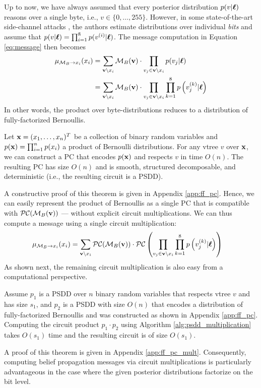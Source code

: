 Up to now, we have always assumed that every posterior distribution $p(v | \boldsymbol{\ell})$ reasons over a single byte, i.e., $v \in \{0,\dots,255\}$. However, in some state-of-the-art side-channel attacks \cite{bit_posterior1, bit_posterior2, breaking_free}, the authors estimate distributions over individual \textit{bits} and assume that $p(v | \boldsymbol{\ell}) = \prod_{i=1}^8 p(v^{(i)} | \boldsymbol{\ell})$. The message computation in Equation \ref{eq:message} then becomes
\begin{align}
\label{eq:bern_message}
    \mu_{\mathcal{M}_B \to x_i}(x_i) &= \sum_{\mathbf{v} \setminus x_i} \mathcal{M}_B(\mathbf{v}) \cdot \prod_{v_j \in \mathbf{v} \setminus x_i} p(v_j | \boldsymbol{\ell}) \\
    &= \sum_{\mathbf{v} \setminus x_i} \mathcal{M}_B(\mathbf{v}) \cdot \prod_{v_j \in \mathbf{v} \setminus x_i} \prod_{k=1}^8 p \left( v_j^{(k)} | \boldsymbol{\ell} \right)
\end{align}
In other words, the product over byte-distributions reduces to a distribution of fully-factorized Bernoullis. 
\begin{theorem}
\label{thoerem:ff_pc}
Let $\mathbf{x} = (x_1,\dots,x_n)^T$ be a collection of binary random variables and $p(\mathbf{x}) = \prod_{i=1}^n p(x_i)$ a product of Bernoulli distributions. For any vtree $v$ over $\mathbf{x}$, we can construct a PC that encodes $p(\mathbf{x})$ and respects $v$ in time $O(n)$. The resulting PC has size $O(n)$ and is smooth, structured decomposable, and deterministic (i.e., the resulting circuit is a PSDD). 
\end{theorem}
A constructive proof of this theorem is given in Appendix \ref{app:ff_pc}.
Hence, we can easily represent the product of Bernoullis as a single PC that is compatible with $\mathcal{PC}(\mathcal{M}_B(\mathbf{v}))$ --- without explicit circuit multiplications. We can thus compute a message using a single circuit multiplication:
\begin{align}
\label{eq:bern_pc_message}
    \mu_{\mathcal{M}_B \to x_i}(x_i) &= \sum_{\mathbf{v} \setminus x_i} \mathcal{PC}(\mathcal{M}_B(\mathbf{v})) \cdot \mathcal{PC} \left( \prod_{v_j \in \mathbf{v} \setminus x_i} \prod_{k=1}^8 p \left(v_j^{(k)} | \boldsymbol{\ell} \right) \right)
\end{align}
As shown next, the remaining circuit multiplication is also easy from a computational perspective.
\begin{theorem}
\label{thoerem:ff_pc_mult}
   Assume $p_1$ is a PSDD over $n$ binary random variables that respects vtree $v$ and has size $s_1$, and $p_2$ is a PSDD with size $O(n)$ that encodes a distribution of fully-factorized Bernoullis and was constructed as shown in Appendix \ref{app:ff_pc}. Computing the circuit product $p_1 \cdot p_2$ using Algorithm \ref{alg:psdd_multiplication} takes $O(s_1)$ time and the resulting circuit is of size $O(s_1)$. 
\end{theorem}
A proof of this theorem is given in Appendix \ref{app:ff_pc_mult}.
Consequently, computing belief propagation messages via circuit multiplications is particularly advantageous in the case where the given posterior distributions factorize on the bit level.